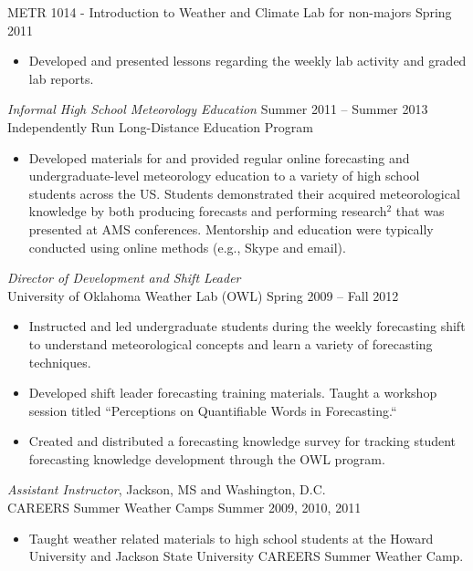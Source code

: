 \documentclass[10pt]{res} %
\begin{document}
\begin{resume}
METR 1014 - Introduction to Weather and Climate Lab for non-majors \hfill Spring 2011
\begin{itemize} \itemsep 2pt %
\item Developed and presented lessons regarding the weekly lab activity and graded lab reports.
\end{itemize}

{\sl  Informal High School Meteorology Education}  \hfill Summer 2011 -- Summer 2013 \\
Independently Run Long-Distance Education Program
\begin{itemize} \itemsep 2pt %
\item Developed materials for and provided regular online forecasting and undergraduate-level meteorology education to a variety of high school students across the US.  Students demonstrated their acquired meteorological knowledge by both producing forecasts and performing research$^{2}$ that was presented at AMS conferences.  Mentorship and education were typically conducted using online methods (e.g., Skype and email).
\end{itemize} 

{\sl Director of Development and Shift Leader} \\[2pt]
University of Oklahoma Weather Lab (OWL) \hfill Spring 2009 -- Fall 2012 
\begin{itemize} \itemsep 2pt %
\item Instructed and led undergraduate students during the weekly forecasting shift to understand meteorological concepts and learn a variety of forecasting techniques.
\item Developed shift leader forecasting training materials.  Taught a workshop session titled ``Perceptions on Quantifiable Words in Forecasting.``
\item Created and distributed a forecasting knowledge survey for tracking student forecasting knowledge development through the OWL program.
\end{itemize} 

{\sl Assistant Instructor}, Jackson, MS and Washington, D.C. \\[2pt]
CAREERS Summer Weather Camps \hfill Summer 2009, 2010, 2011 
\begin{itemize} \itemsep 2pt %
\item Taught weather related materials to high school students at the Howard University and Jackson State University CAREERS Summer Weather Camp.
\end{itemize} 


\end{resume}
\end{document}

